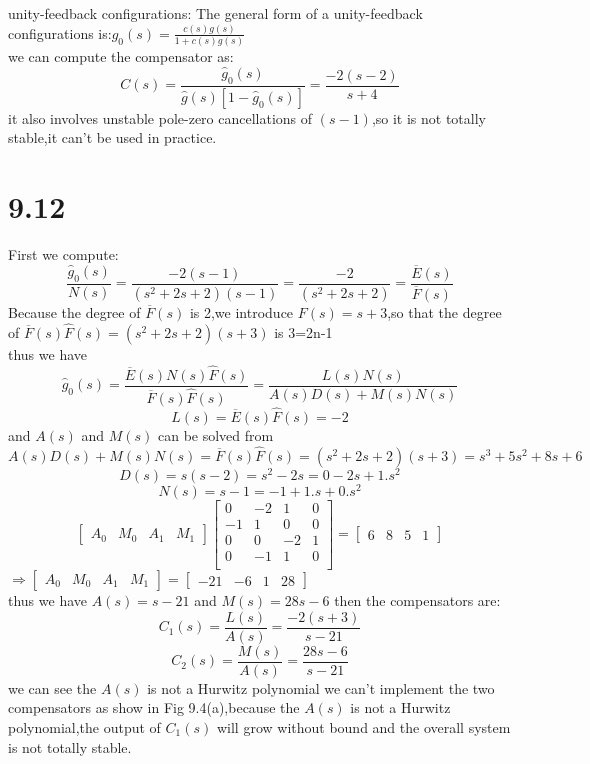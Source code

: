 \documentclass{article}
\begin{document}
unity-feedback configurations:
The general form of a unity-feedback configurations is:$\hat{g}_0(s)=\frac{c(s)g(s)}{1+c(s)g(s)}$\\
we can compute the compensator as:
\[C(s)=\frac{\hat{g}_0(s)}{\hat{g}(s)[1-\hat{g}_0(s)]}=\frac{-2(s-2)}{s+4}\]
it also involves unstable pole-zero cancellations of $(s-1)$,so it is not totally stable,it can't be used in practice.

\section*{9.12}
First we compute:
\[\frac{\hat{g}_0(s)}{N(s)}=\frac{-2(s-1)}{(s^2+2s+2)(s-1)}=\frac{-2}{(s^2+2s+2)}=\frac{\overline{E}(s)}{\overline{F}(s)}\]
Because the degree of $\overline{F}(s)$ is 2,we introduce $F(s)=s+3$,so that the degree of $\overline{F}(s)\hat{F}(s)=(s^2+2s+2)(s+3)$ is 3=2n-1\\
thus we have
\[\hat{g}_0(s)=\frac{\overline{E}(s)N(s)\hat{F}(s)}{\overline{F}(s)\hat{F}(s)}=\frac{L(s)N(s)}{A(s)D(s)+M(s)N(s)}\]
\[L(s)=\overline{E}(s)\hat{F}(s)=-2\]
and $A(s)$ and $M(s)$ can be solved from 
\[A(s)D(s)+M(s)N(s)=\overline{F}(s)\hat{F}(s)=(s^2+2s+2)(s+3)=s^3+5s^2+8s+6\]
\[D(s)=s(s-2)=s^2-2s=0-2s+1.s^2\]
\[N(s)=s-1=-1+1.s+0.s^2\]
\[
\left[
    \begin{array}{cccc}
        A_0 & M_0 & A_1 & M_1
    \end{array}
\right]   
\left[ 
        \begin{array}{cccc}
            0 & -2 & 1 & 0\\
            -1 & 1 & 0 & 0\\
            0 & 0 & -2 & 1\\
            0 & -1 & 1 & 0\\
        \end{array}
\right]=\left[ 
    \begin{array}{cccc}
        6 & 8 & 5 & 1
    \end{array}
\right] 
\]
$\Rightarrow 
\left[
    \begin{array}{cccc}
    A_0 & M_0 & A_1 & M_1
    \end{array}
\right]=
\left[
    \begin{array}{cccc}
        -21 & -6 & 1 & 28
    \end{array}
\right]
$\\
thus we have $A(s)=s-21$ and $M(s)=28s-6$
then the compensators are:
\[C_1(s)=\frac{L(s)}{A(s)}=\frac{-2(s+3)}{s-21}\]
\[C_2(s)=\frac{M(s)}{A(s)}=\frac{28s-6}{s-21}\]
we can see the $A(s)$ is not a Hurwitz polynomial
we can't implement the two compensators as show in Fig 9.4(a),because the $A(s)$ is not a
Hurwitz polynomial,the output of $C_1(s)$ will grow without bound and the overall system is not totally stable.
\end{document}
